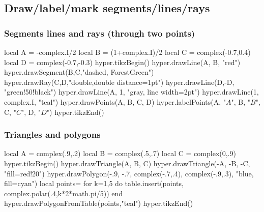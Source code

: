 \documentclass{article}
\begin{document}
\subsection{Draw/label/mark  segments/lines/rays}

\subsubsection{Segments lines and rays (through two points)}
\begin{codeandresult}
\begin{luacode*}
local A = -complex.I/2
local B = (1+complex.I)/2
local C = complex(-0.7,0.4)
local D = complex(-0.7,-0.3)
hyper.tikzBegin()
hyper.drawLine(A, B, "red")
hyper.drawSegment(B,C,"dashed, ForestGreen")
hyper.drawRay(C,D,"double,double distance=1pt")
hyper.drawLine(D,-D, "green!50!black")
hyper.drawLine(A, 1, "gray, line width=2pt")
hyper.drawLine(1, complex.I, "teal")
hyper.drawPoints(A, B, C, D)
hyper.labelPoints(A, "$A$", B, "$B$", C, "$C$", D, "$D$")
hyper.tikzEnd()
\end{luacode*}
\end{codeandresult}



\subsubsection{Triangles and polygons}
\begin{codeandresult}
\begin{luacode*}
local A = complex(.9,.2)
local B = complex(.5,.7)
local C = complex(0,.9)
hyper.tikzBegin()
hyper.drawTriangle(A, B, C)
hyper.drawTriangle(-A, -B, -C, "fill=red!20")
hyper.drawPolygon(-.9, -.7, complex(-.7,.4), complex(-.9,.3), "blue, fill=cyan")
local points={}
for k=1,5 do
	table.insert(points, complex.polar(.4,k*2*math.pi/5))
end
hyper.drawPolygonFromTable(points,"teal")
hyper.tikzEnd()
\end{luacode*}
\end{codeandresult}
\end{document}
